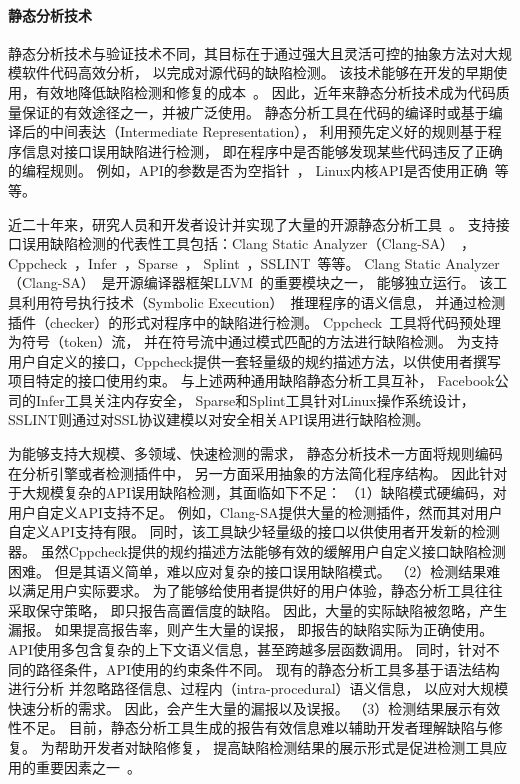 \paragraph{静态分析技术}
静态分析技术与验证技术不同，其目标在于通过强大且灵活可控的抽象方法对大规模软件代码高效分析，
以完成对源代码的缺陷检测。
该技术能够在开发的早期使用，有效地降低缺陷检测和修复的成本~\cite{06-cost}。
因此，近年来静态分析技术成为代码质量保证的有效途径之一，并被广泛使用。
静态分析工具在代码的编译时或基于编译后的中间表达（Intermediate Representation），
利用预先定义好的规则基于程序信息对接口误用缺陷进行检测，
即在程序中是否能够发现某些代码违反了正确的编程规则。
例如，API的参数是否为空指针~\cite{00-osdi-npd}，
Linux内核API是否使用正确~\cite{09-dsn-linux}等等。

近二十年来，研究人员和开发者设计并实现了大量的开源静态分析工具~\cite{wiki-static-tool}。
支持接口误用缺陷检测的代表性工具包括：Clang Static Analyzer（Clang-SA）~\cite{clang-sa}，
Cppcheck~\cite{cppcheck}，Infer~\cite{infer}，Sparse~\cite{sparse}，
Splint~\cite{splint}，SSLINT~\cite{15-sp-sslint}等等。
Clang Static Analyzer（Clang-SA）~\cite{clang-sa}是开源编译器框架LLVM~\cite{llvm}的重要模块之一，
能够独立运行。
该工具利用符号执行技术（Symbolic Execution）~\cite{13-acm-se}推理程序的语义信息，
并通过检测插件（checker）的形式对程序中的缺陷进行检测。
Cppcheck~\cite{cppcheck}工具将代码预处理为符号（token）流，
并在符号流中通过模式匹配的方法进行缺陷检测。
为支持用户自定义的接口，Cppcheck提供一套轻量级的规约描述方法，以供使用者撰写项目特定的接口使用约束。
与上述两种通用缺陷静态分析工具互补，
Facebook公司的Infer工具关注内存安全，
Sparse和Splint工具针对Linux操作系统设计，
SSLINT则通过对SSL协议建模以对安全相关API误用进行缺陷检测。


为能够支持大规模、多领域、快速检测的需求，
静态分析技术一方面将规则编码在分析引擎或者检测插件中，
另一方面采用抽象的方法简化程序结构。
因此针对于大规模复杂的API误用缺陷检测，其面临如下不足：
（1）缺陷模式硬编码，对用户自定义API支持不足。
例如，Clang-SA提供大量的检测插件，然而其对用户自定义API支持有限。
同时，该工具缺少轻量级的接口以供使用者开发新的检测器。
虽然Cppcheck提供的规约描述方法能够有效的缓解用户自定义接口缺陷检测困难。
但是其语义简单，难以应对复杂的接口误用缺陷模式。
（2）检测结果难以满足用户实际要求。
为了能够给使用者提供好的用户体验，静态分析工具往往采取保守策略，
即只报告高置信度的缺陷。
因此，大量的实际缺陷被忽略，产生漏报。
如果提高报告率，则产生大量的误报，
即报告的缺陷实际为正确使用。
API使用多包含复杂的上下文语义信息，甚至跨越多层函数调用。
同时，针对不同的路径条件，API使用的约束条件不同。
现有的静态分析工具多基于语法结构进行分析
并忽略路径信息、过程内（intra-procedural）语义信息，
以应对大规模快速分析的需求。
因此，会产生大量的漏报以及误报。
（3）检测结果展示有效性不足。
目前，静态分析工具生成的报告有效信息难以辅助开发者理解缺陷与修复。
为帮助开发者对缺陷修复，
提高缺陷检测结果的展示形式是促进检测工具应用的重要因素之一~\cite{13-icse-donotuse}。


